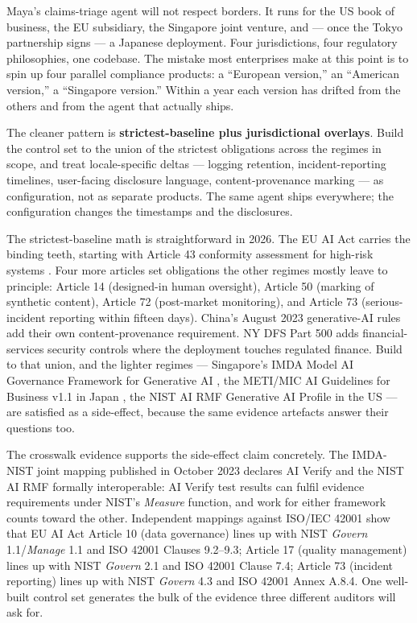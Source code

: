 Maya's claims-triage agent will not respect borders. It runs for the US book of business, the EU subsidiary, the Singapore joint venture, and --- once the Tokyo partnership signs --- a Japanese deployment. Four jurisdictions, four regulatory philosophies, one codebase. The mistake most enterprises make at this point is to spin up four parallel compliance products: a ``European version,'' an ``American version,'' a ``Singapore version.'' Within a year each version has drifted from the others and from the agent that actually ships.

The cleaner pattern is \textbf{strictest-baseline plus jurisdictional overlays}. Build the control set to the union of the strictest obligations across the regimes in scope, and treat locale-specific deltas --- logging retention, incident-reporting timelines, user-facing disclosure language, content-provenance marking --- as configuration, not as separate products. The same agent ships everywhere; the configuration changes the timestamps and the disclosures.

The strictest-baseline math is straightforward in 2026. The EU AI Act carries the binding teeth, starting with Article 43 conformity assessment for high-risk systems \citep{euAIact2024}. Four more articles set obligations the other regimes mostly leave to principle: Article 14 (designed-in human oversight), Article 50 (marking of synthetic content), Article 72 (post-market monitoring), and Article 73 (serious-incident reporting within fifteen days). China's August 2023 generative-AI rules add their own content-provenance requirement. NY DFS Part 500 adds financial-services security controls where the deployment touches regulated finance. Build to that union, and the lighter regimes --- Singapore's IMDA Model AI Governance Framework for Generative AI \citep{imdaModelAIGenAI2024}, the METI/MIC AI Guidelines for Business v1.1 in Japan \citep{metiAIGuidelines2025}, the NIST AI RMF Generative AI Profile in the US \citep{nist-genai-600-1} --- are satisfied as a side-effect, because the same evidence artefacts answer their questions too.

The crosswalk evidence supports the side-effect claim concretely. The IMDA-NIST joint mapping published in October 2023 \citep{imdaNistCrosswalk2023} declares AI Verify and the NIST AI RMF formally interoperable: AI Verify test results can fulfil evidence requirements under NIST's \textit{Measure} function, and work for either framework counts toward the other. Independent mappings against ISO/IEC 42001 show that EU AI Act Article 10 (data governance) lines up with NIST \textit{Govern} 1.1/\textit{Manage} 1.1 and ISO 42001 Clauses 9.2--9.3; Article 17 (quality management) lines up with NIST \textit{Govern} 2.1 and ISO 42001 Clause 7.4; Article 73 (incident reporting) lines up with NIST \textit{Govern} 4.3 and ISO 42001 Annex A.8.4. One well-built control set generates the bulk of the evidence three different auditors will ask for.


